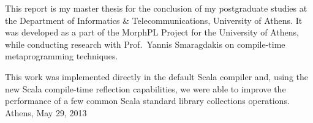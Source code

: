 This report is my master thesis for the conclusion of my postgraduate studies at the
Department of Informatics \& Telecommunications, University of Athens.
It was developed as a part of the MorphPL Project for the University of Athens, 
while conducting research with Prof.~Yannis Smaragdakis 
on compile-time metaprogramming techniques.

This work was implemented directly in the default Scala compiler and, using the new Scala compile-time reflection capabilities, we were able to improve the performance of a few common Scala standard library collections operations.\\

\hfill{Athens,  May 29, 2013}
